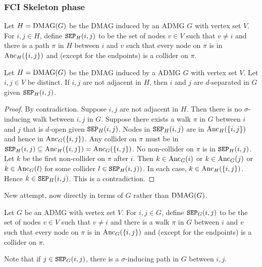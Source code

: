 \subsubsection{FCI Skeleton phase}

\begin{Def}
  Let $H = \mathrm{DMAG}(G)$ be the DMAG induced by an ADMG $G$ with vertex set $V$.
  For $i,j \in H$, define $\mathtt{SEP}_H(i,j)$ to be the set of nodes $v \in V$ such that
  $v \ne i$ and there is a path $\pi$ in $H$ between $i$ and $v$ such that every node
  on $\pi$ is in $\mathrm{Anc}_H(\{i,j\})$ and (except for the endpoints) is a collider on $\pi$.
\end{Def}

\begin{Prp}
  Let $H = \mathrm{DMAG}(G)$ be the DMAG induced by a ADMG $G$ with vertex set $V$.
  Let $i,j \in V$ be distinct.
  If $i,j$ are not adjacent in $H$, then $i$ and $j$ are $d$-separated in $G$ given $\mathtt{SEP}_H(i,j)$.
\end{Prp}
\begin{proof}
  By contradiction.
  Suppose $i,j$ are not adjacent in $H$.
  Then there is no $\sigma$-inducing walk between $i,j$ in $G$.
  Suppose there exists a walk $\pi$ in $G$ between $i$ and $j$ that is $d$-open given $\mathtt{SEP}_H(i,j)$.
  Nodes in $\mathtt{SEP}_H(i,j)$ are in $\mathrm{Anc}_H(\{i,j\})$ and hence in $\mathrm{Anc}_G(\{i,j\})$.
  Any collider on $\pi$ must be in $\mathtt{SEP}_H(i,j) \subseteq \mathrm{Anc}_H(\{i,j\}) = \mathrm{Anc}_G(\{i,j\})$.
  No non-collider on $\pi$ is in $\mathtt{SEP}_H(i,j)$.
  Let $k$ be the first non-collider on $\pi$ after $i$.
  Then $k \in \mathrm{Anc}_G(i)$ or $k \in \mathrm{Anc}_G(j)$ or $k \in \mathrm{Anc}_G(l)$ for some collider $l \in \mathtt{SEP}_H(i,j))$.
  In each case, $k \in \mathrm{Anc}_H(\{i,j\})$.
  Hence $k \in \mathtt{SEP}_H(i,j)$.
  This is a contradiction.
\end{proof}

New attempt, now directly in terms of $G$ rather than $\mathrm{DMAG}(G)$.

\begin{Def}
  Let $G$ be an ADMG with vertex set $V$.
  For $i,j \in G$, define $\mathtt{SEP}_G(i,j)$ to be the set of nodes $v \in V$ such that
  $v \ne i$ and there is a walk $\pi$ in $G$ between $i$ and $v$ such that every node
  on $\pi$ is in $\mathrm{Anc}_G(\{i,j\})$ and (except for the endpoints) is a collider on $\pi$.
\end{Def}
Note that if $j \in \mathtt{SEP}_G(i,j)$, there is a $\sigma$-inducing path in $G$ between $i,j$.

